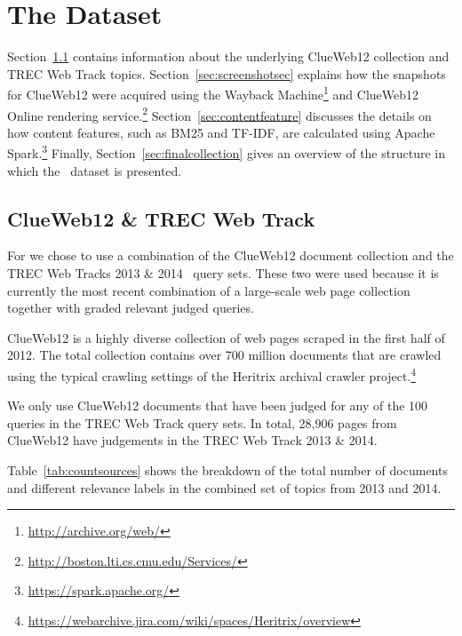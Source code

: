 
\section{The \protect\datasetname{} Data\-set}
\label{sec:dataset}
Section~\ref{sec:trecclue} contains information about the underlying ClueWeb12 collection and TREC Web Track topics. Section~\ref{sec:screenshotsec} explains how the snapshots for ClueWeb12 were acquired using the Wayback Machine\footnote{\url{http://archive.org/web/}} and ClueWeb12 Online rendering service.\footnote{\url{http://boston.lti.cs.cmu.edu/Services/}} Section~\ref{sec:contentfeature} discusses the details on how content features, such as BM25 and TF-IDF, are calculated using Apache Spark.\footnote{\url{https://spark.apache.org/}} Finally, Section~\ref{sec:finalcollection} gives an overview of the structure in which the \datasetname~dataset is presented.
\fi

\subsection{ClueWeb12 \& TREC Web Track}\label{sec:trecclue}
For \datasetname{} we chose to use a combination of the ClueWeb12 document collection and the TREC Web Tracks 2013 \& 2014~\cite{collins2013trec,collins2015trec} query sets. These two were used because it is currently the most recent combination of a large-scale web page collection together with graded relevant judged queries. 

ClueWeb12 is a highly diverse collection of web pages scraped in the first half of 2012.
The total collection contains over 700 million documents that are crawled using the typical crawling settings of the Heritrix archival crawler project.\footnote{\url{https://webarchive.jira.com/wiki/spaces/Heritrix/overview}}

We only use ClueWeb12 documents that have been judged for any of the 100 queries in the TREC Web Track query sets. In total, 28,906 pages from ClueWeb12 have judgements in the TREC Web Track 2013 \& 2014. 

Table~\ref{tab:countsources} shows the breakdown of the total number of documents and different relevance labels in the combined set of topics from 2013 and 2014.


